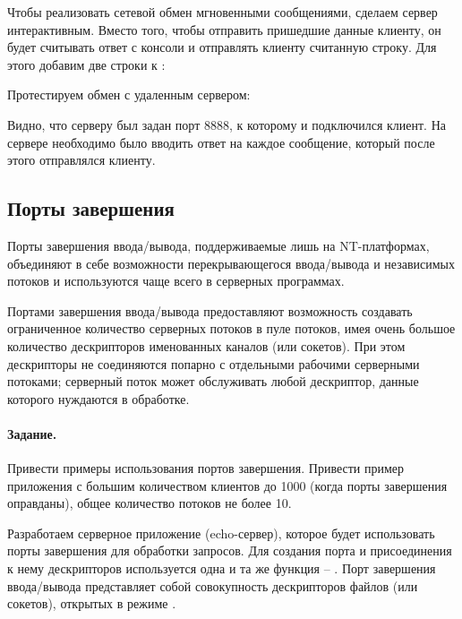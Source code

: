 Чтобы реализовать сетевой обмен мгновенными сообщениями, сделаем сервер интерактивным. Вместо того, чтобы отправить пришедшие данные клиенту, он будет считывать ответ с консоли и отправлять клиенту считанную строку. Для этого добавим две строки к :



Протестируем обмен с удаленным сервером:





Видно, что серверу был задан порт 8888, к которому и подключился клиент. На сервере необходимо было вводить ответ на каждое сообщение, который после этого отправлялся клиенту.

\subsection{Порты завершения}

Порты завершения ввода/вывода, поддерживаемые лишь на NT-платформах, объединяют в себе возможности перекрывающегося ввода/вывода и независимых потоков и используются чаще всего в серверных программах.

Портами завершения ввода/вывода предоставляют возможность создавать ограниченное количество серверных потоков в пуле потоков, имея очень большое количество дескрипторов именованных каналов (или сокетов). При этом дескрипторы не соединяются попарно с отдельными рабочими серверными потоками; серверный поток может обслуживать любой дескриптор, данные которого нуждаются в обработке.

\paragraph{Задание.} Привести примеры использования портов завершения. Привести пример приложения с большим количеством клиентов до 1000 (когда порты завершения оправданы), общее количество потоков не более 10.

Разработаем серверное приложение (echo-сервер), которое будет использовать порты завершения для обработки запросов. Для создания порта и присоединения к нему дескрипторов используется одна и та же функция -- . Порт завершения ввода/вывода представляет собой совокупность дескрипторов файлов (или сокетов), открытых в режиме .

